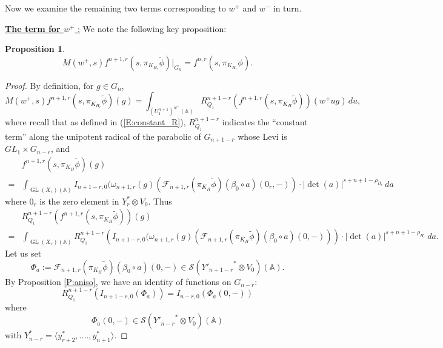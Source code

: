 \documentclass[10pt]{amsart}
\theoremstyle{plain}
\newtheorem{Prop}[equation]{Proposition}
\numberwithin{equation}{section}
\begin{document}
 
 
 \vskip 5pt
 Now we examine the remaining two terms corresponding to $w^+$ and $w^-$ in turn.
 \vskip 5pt
 
 \noindent\underline{{\bf The term for $w^+$} :}
 We note the following key proposition:
 \begin{Prop}  \label{P:key1}
 \[
 M(w^+,s) f^{n+1,r}(s, \pi_{K_{H_r}} \tilde{\phi})|_{G_{n}}   =  f^{n,r}(s, \pi_{K_{H_r}} \phi). \]
  \end{Prop}
 \vskip 5pt
 
 \begin{proof}
 By definition, for $g \in G_n$,
\[
 M(w^+,s) f^{n+1,r}(s, \pi_{K_{H_r}} \tilde{\phi}) (g)  
 =  \int_{(U^{n+1}_1)^{w^+}({\mathbb{A}})} R^{n+1-r}_{Q_1}( f^{n+1,r}(s,\pi_{K_H}  \tilde{\phi}))(w^+ ug)  \, du,
 \]
where recall that as defined in (\ref{E:constant_R}),
$R_{Q_1}^{n+1-r}$ indicates the ``constant term'' along the unipotent radical
of the parabolic of $G_{n+1-r}$ whose Levi is $GL_1\times G_{n-r}$,
and 
 \begin{align*}
 &f^{n+1,r}(s,\pi_{K_H}  \tilde{\phi})(g)\\
 =&\int_{{\operatorname{GL}}(X_r)({\mathbb{A}})} I_{n+1-r, 0}(\omega_{n+1,r}(g)(\mathcal{F}_{n+1,r}(
 \pi_{K_H} \tilde{\phi}) (\beta_0 \circ a) (0_r,-))  \cdot
 |\det(a)|^{s+n+1-\rho_{H_r}} \, da
\end{align*}
 where $0_r$ is the zero element in $Y_r^* \otimes V_0$.  
Thus
\begin{align*}
 &  R^{n+1-r}_{Q_1}( f^{n+1,r}(s,\pi_{K_H}  \tilde{\phi}))(g)\\
=&\int_{{\operatorname{GL}}(X_r)({\mathbb{A}})} R^{n+1-r}_{Q_1} \left( I_{n+1-r,
     0}(\omega_{n+1,r}(g)(\mathcal{F}_{n+1,r}( \pi_{K_H} \tilde{\phi})
   (\beta_0 \circ a) (0,-))  \right) \cdot
 |\det(a)|^{s+n+1-\rho_{H_r}} \, da.
\end{align*}
Let us set
 \[  \Phi_a := \mathcal{F}_{n+1,r}( \pi_{K_H} \tilde{\phi}) (\beta_0
 \circ a) (0,-) \in \mathcal{S}({Y'_{n+1-r}}^* \otimes V_0)({\mathbb{A}}). \]
 By Proposition \ref{P:aniso}, we have an identity of functions on $G_{n-r}$:
 \[   R^{n+1-r}_{Q_1}( I_{n+1-r,0}(\Phi_a))  = I_{n-r, 0}(\Phi_a(0,-)) \]
 where
 \[  \Phi_a(0,-) \in \mathcal{S}({Y'_{n-r}}^* \otimes V_0)({\mathbb{A}}) \]
 with $Y_{n-r}^* = \langle y_{r+2}^*,...., y_{n+1}^* \rangle$. 
\vskip 5pt


\end{proof}
\end{document}
